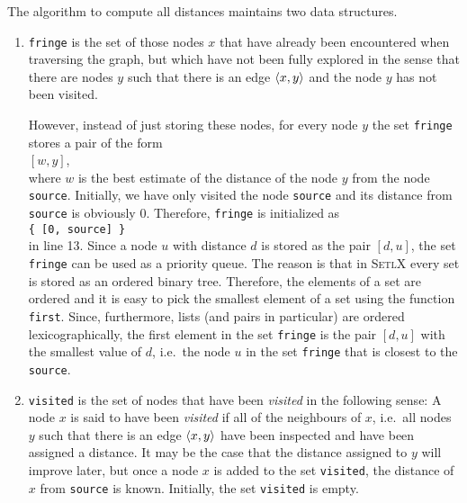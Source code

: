 The algorithm to compute all distances maintains two data structures.
\begin{enumerate}
\item \texttt{fringe} is the set of those nodes $x$ that have already been encountered when traversing
      the graph, but which have not been fully explored in the sense that there are nodes $y$ such
      that there is an edge $\pair(x,y)$ and the node $y$ has not been visited.
      
      However, instead of just storing these nodes, for every node $y$ the set \texttt{fringe} stores a pair
      of the form 
      \\[0.2cm]
      \hspace*{1.3cm}
      $[w, y]$,
      \\[0.2cm]
      where $w$ is the best estimate of the distance of the node $y$ from the node \texttt{source}.
      Initially, we have only visited the node \texttt{source} and its distance from \texttt{source}
      is obviously $0$.  Therefore, \texttt{fringe} is initialized as
      \\[0.2cm]
      \hspace*{1.3cm}
      \texttt{\{ [0, source] \}}
      \\[0.2cm]
      in line 13.  Since a node $u$ with distance $d$ is stored as the pair $[d, u]$, the set
      \texttt{fringe} can be used as a priority queue.  The reason is that in \textsc{SetlX} every
      set is stored as an ordered binary tree.  Therefore, the elements of a set are ordered and it
      is easy to pick the smallest element of a set using the function \texttt{first}.  
      Since, furthermore, lists (and pairs in
      particular) are ordered lexicographically, the first element in the set \texttt{fringe} is 
      the pair $[d, u]$ with the smallest value of $d$, i.e.~the node $u$ in the set \texttt{fringe}
      that is closest to the \texttt{source}.
\item \texttt{visited} is the set of nodes that have been \emph{visited} in the following sense:
      A node $x$ is said to have been \emph{visited} if all of the neighbours of $x$, i.e.~all nodes
      $y$ such that there is an edge $\pair(x,y)$ have been inspected and have been assigned a 
      distance.  It may be the case that the distance assigned to $y$ will improve later,
      but once a node $x$ is added to the set \texttt{visited}, the distance of $x$ from
      \texttt{source} is known.  Initially, the set \texttt{visited} is empty.
\end{enumerate}
